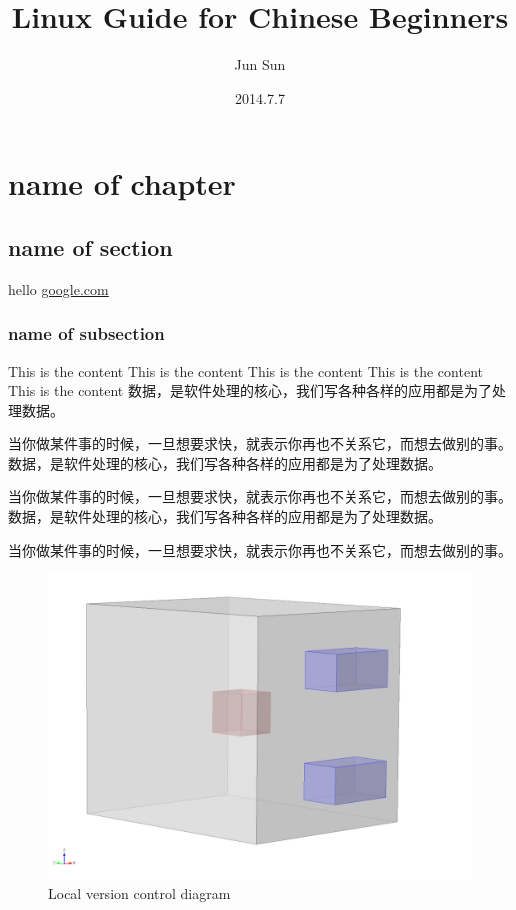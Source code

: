 \documentclass[11pt, a4paper]{book}
\begin{document}
\title{Linux Guide for Chinese Beginners}
\author{Jun Sun}
\date{2014.7.7}
\maketitle
\tableofcontents\newpage

\chapter{name of chapter}
\section{name of section}
hello
\url{google.com}
\subsection{name of subsection}
This is the content
This is the content
This is the content
This is the content
This is the content
数据，是软件处理的核心，我们写各种各样的应用都是为了处理数据。

当你做某件事的时候，一旦想要求快，就表示你再也不关系它，而想去做别的事。数据，是软件处理的核心，我们写各种各样的应用都是为了处理数据。

当你做某件事的时候，一旦想要求快，就表示你再也不关系它，而想去做别的事。数据，是软件处理的核心，我们写各种各样的应用都是为了处理数据。

当你做某件事的时候，一旦想要求快，就表示你再也不关系它，而想去做别的事。

\begin{figure}[htb]
\centering
\includegraphics{./figures/two_port_model.jpg}
\caption{Local version control diagram}
\end{figure}
\end{document}
